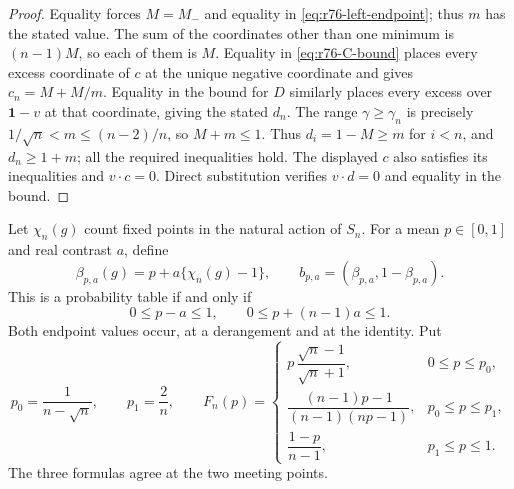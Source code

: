 \begin{proof}
Equality forces $M=M_-$ and equality in
\eqref{eq:r76-left-endpoint}; thus $m$ has the stated value. The sum of
the coordinates other than one minimum is $(n-1)M$, so each of them
is $M$. Equality in \eqref{eq:r76-C-bound} places every excess
coordinate of $c$ at the unique negative coordinate and gives
$c_n=M+M/m$. Equality in the bound for $D$ similarly places every
excess over $\mathbf1-v$ at that coordinate, giving the stated $d_n$.
The range $\gamma\ge\gamma_n$ is precisely
$1/\sqrt n<m\le(n-2)/n$, so $M+m\le1$. Thus $d_i=1-M\ge m$
for $i<n$, and $d_n\ge1+m$; all the required inequalities hold.
The displayed $c$ also satisfies its inequalities and $v\cdot c=0$.
Direct substitution verifies $v\cdot d=0$ and equality in the bound.
\end{proof}

Let $\chi_n(g)$ count fixed points in the natural action of $S_n$.
For a mean $p\in[0,1]$ and real contrast $a$, define
\begin{equation}\label{eq:r76-mean-contrast-family}
 \beta_{p,a}(g)=p+a\{\chi_n(g)-1\},\qquad
 b_{p,a}=(\beta_{p,a},1-\beta_{p,a}).
\end{equation}
This is a probability table if and only if
\begin{equation}\label{eq:r76-feasible-mean-contrast}
 0\le p-a\le1,\qquad 0\le p+(n-1)a\le1.
\end{equation}
Both endpoint values occur, at a derangement and at the identity.
Put
\begin{equation}\label{eq:r76-mean-threshold}
 p_0=\frac1{n-\sqrt n},\qquad p_1=\frac2n,\qquad
 F_n(p)=\begin{cases}
 p\,\dfrac{\sqrt n-1}{\sqrt n+1},&0\le p\le p_0,\\[4pt]
 \dfrac{(n-1)p-1}{(n-1)(np-1)},&p_0\le p\le p_1,\\[4pt]
 \dfrac{1-p}{n-1},&p_1\le p\le1.
 \end{cases}
\end{equation}
The three formulas agree at the two meeting points.


